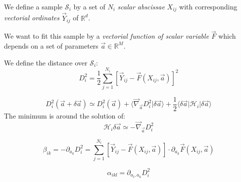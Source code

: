 \documentclass[aps,12pt]{revtex4}
\begin{document}
We define a sample $\mathcal{S}_i$ 
by a set of $N_i$ \emph{scalar abscissae} $X_{ij}$ with corresponding \emph{vectorial ordinates} $\vec{Y}_{ij}$ of $\mathbb{R}^d$.

We want to fit this sample by a \emph{vectorial function of scalar variable} $\vec{F}$ which depends on a set of parameters $\vec{a}\in\mathbb{R}^M$.

We define the distance over $\mathcal{S}_i$:
\begin{equation}
	D^2_i = \dfrac{1}{2}\sum_{j=1}^{N_i} \left[ \vec{Y}_{ij} - \vec{F}(X_{ij},\vec{a})\right]^2
\end{equation}

\begin{equation}
	D^2_i(\vec{a}+\delta\vec{a}) \simeq D^2_i(\vec{a}) + \langle \vec{\nabla}_{\vec{a}} D^2_i \vert \delta \vec{a} \rangle
	+ \dfrac{1}{2} \langle \delta\vec{a} \vert \mathcal{H}_i \vert \delta \vec{a} \rangle
\end{equation}
The minimum is around the solution of:
\begin{equation}
	\mathcal{H}_i   \delta \vec{a}  \simeq -\vec{\nabla}_{\vec{a}} D^2_i 
\end{equation}

\begin{equation}
	\beta_{ik} = -\partial_{a_k}D^2_i = \sum_{j=1}^{N_i} \left[ \vec{Y}_{ij} - \vec{F}(X_{ij},\vec{a})\right] \cdot \partial_{a_k}\vec{F}(X_{ij},\vec{a})
\end{equation}

\begin{equation}
	\alpha_{ikl} = \partial_{a_l,a_k} D^2_i 
\end{equation}
\end{document}

